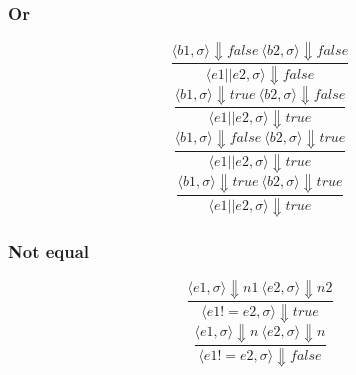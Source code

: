 \documentclass[12pt]{article}
\begin{document}
                \subsubsection{Or}
                    \begin{equation}  
                        \frac{\langle b1, \sigma \rangle\Downarrow false \: \langle b2, \sigma \rangle\Downarrow false}
                        {\langle e1 || e2, \sigma \rangle\Downarrow false}
                    \end{equation}
                    \begin{equation}  
                        \frac{\langle b1, \sigma \rangle\Downarrow true \: \langle b2, \sigma \rangle\Downarrow false}
                        {\langle e1 || e2, \sigma \rangle\Downarrow true}
                    \end{equation}
                    \begin{equation}  
                        \frac{\langle b1, \sigma \rangle\Downarrow false \: \langle b2, \sigma \rangle\Downarrow true}
                        {\langle e1 || e2, \sigma \rangle\Downarrow true}
                    \end{equation}
                    \begin{equation}  
                        \frac{\langle b1, \sigma \rangle\Downarrow true \: \langle b2, \sigma \rangle\Downarrow true}
                        {\langle e1 || e2, \sigma \rangle\Downarrow true}
                    \end{equation}
                    
                \subsubsection{Not equal}
                    \begin{equation}  
                        \frac{\langle e1, \sigma \rangle\Downarrow n1 \: \langle e2, \sigma \rangle\Downarrow n2}
                        {\langle e1 != e2, \sigma \rangle\Downarrow true}
                    \end{equation}
                    \begin{equation}  
                        \frac{\langle e1, \sigma \rangle\Downarrow n \: \langle e2, \sigma \rangle\Downarrow n}
                        {\langle e1 != e2, \sigma \rangle\Downarrow false}
                    \end{equation}
                    
\end{document}
